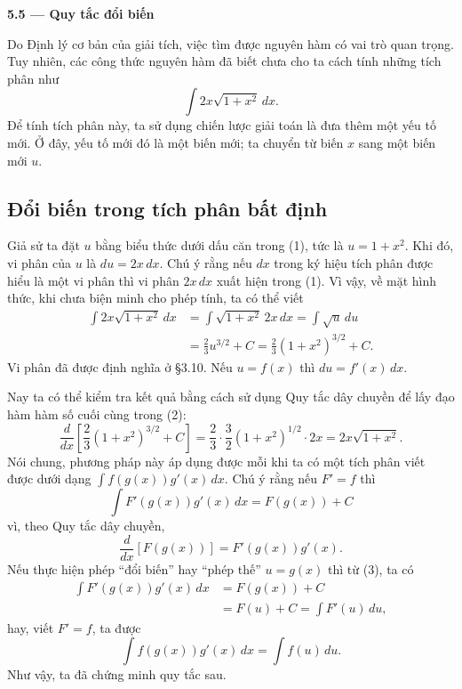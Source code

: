 \documentclass[12pt,a4paper]{article}
\begin{document}
\begin{center}{\LARGE\bfseries 5.5 — Quy tắc đổi biến}\end{center}

Do Định lý cơ bản của giải tích, việc tìm được nguyên hàm có vai trò quan trọng. Tuy nhiên, các công thức nguyên hàm đã biết chưa cho ta cách tính những tích phân như
\begin{equation}\int2x\sqrt{1+x^2}\,dx.\tag{1}\end{equation}
Để tính tích phân này, ta sử dụng chiến lược giải toán là đưa thêm một yếu tố mới. Ở đây, yếu tố mới đó là một biến mới; ta chuyển từ biến $x$ sang một biến mới $u$.

\subsection*{Đổi biến trong tích phân bất định}
Giả sử ta đặt $u$ bằng biểu thức dưới dấu căn trong (1), tức là $u=1+x^2$. Khi đó, vi phân của $u$ là $du=2x\,dx$. Chú ý rằng nếu $dx$ trong ký hiệu tích phân được hiểu là một vi phân thì vi phân $2x\,dx$ xuất hiện trong (1). Vì vậy, về mặt hình thức, khi chưa biện minh cho phép tính, ta có thể viết
\begin{align*}
\int2x\sqrt{1+x^2}\,dx&=\int\sqrt{1+x^2}\,2x\,dx=\int\sqrt u\,du\\
&=\frac23u^{3/2}+C=\frac23(1+x^2)^{3/2}+C.\tag{2}
\end{align*}
Vi phân đã được định nghĩa ở §3.10. Nếu $u=f(x)$ thì $du=f'(x)\,dx$.

Nay ta có thể kiểm tra kết quả bằng cách sử dụng Quy tắc dây chuyền để lấy đạo hàm hàm số cuối cùng trong (2):
\[
\frac{d}{dx}\left[\frac23(1+x^2)^{3/2}+C\right]
=\frac23\cdot\frac32(1+x^2)^{1/2}\cdot2x=2x\sqrt{1+x^2}.
\]
Nói chung, phương pháp này áp dụng được mỗi khi ta có một tích phân viết được dưới dạng $\int f(g(x))g'(x)\,dx$. Chú ý rằng nếu $F'=f$ thì
\begin{equation}\int F'(g(x))g'(x)\,dx=F(g(x))+C\tag{3}\end{equation}
vì, theo Quy tắc dây chuyền,
\[\frac{d}{dx}[F(g(x))]=F'(g(x))g'(x).\]
Nếu thực hiện phép ``đổi biến'' hay ``phép thế'' $u=g(x)$ thì từ (3), ta có
\begin{align*}
\int F'(g(x))g'(x)\,dx&=F(g(x))+C\\
&=F(u)+C=\int F'(u)\,du,
\end{align*}
hay, viết $F'=f$, ta được
\[\int f(g(x))g'(x)\,dx=\int f(u)\,du.\]
Như vậy, ta đã chứng minh quy tắc sau.
\end{document}
